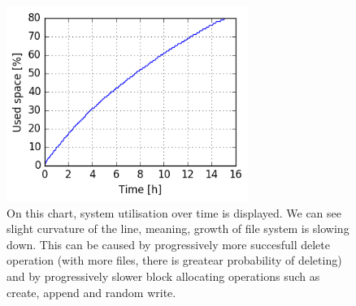 \documentclass[
  color, %
  table, %
  lof,   %
  lot,   %
]{fithesis3}
\begin{document}
\begin{figure}[!htb]
    \begin{minipage}{\textwidth}
        \centering
        \includegraphics[width=0.7\textwidth]{../charts/HDD_xfs/600.png}
        \caption[Usage of available space of XFS during testing of medium utilisation of HDD]{On this chart, system utilisation over time is displayed. We can see slight curvature of the line, meaning, growth of file system is slowing down. This can be caused by progressively more succesfull delete operation (with more files, there is greatear probability of deleting) and by progressively slower block allocating operations such as create, append and random write.}
\label{fig:usage80_xfs}
    \end{minipage}
\end{figure}
\end{document}

